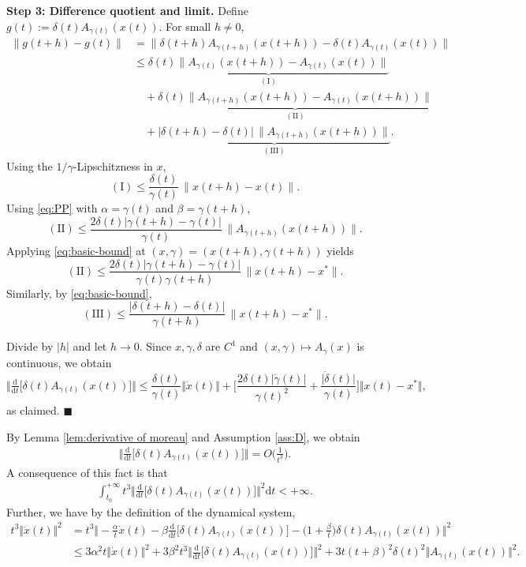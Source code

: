 \documentclass[11pt]{article}
\numberwithin{equation}{section}
\newenvironment{proof}{\bigskip\noindent{\bf Proof.}}{\hfill $\blacksquare$ \par\bigskip\noindent}
\begin{document}
\begin{proof}
\textbf{Step 3: Difference quotient and limit.}
Define $g(t):=\delta(t)A_{\gamma(t)}(x(t))$. For small $h\neq0$,
\[
\begin{aligned}
\|g(t+h)-g(t)\|
&= \|\delta(t+h)A_{\gamma(t+h)}(x(t+h))-\delta(t)A_{\gamma(t)}(x(t))\|\\
&\le \underbrace{\delta(t)\|A_{\gamma(t)}(x(t+h))-A_{\gamma(t)}(x(t))\|}_{\mathrm{(I)}}\\
&\quad + \underbrace{\delta(t)\|A_{\gamma(t+h)}(x(t+h))-A_{\gamma(t)}(x(t+h))\|}_{\mathrm{(II)}}\\
&\quad + \underbrace{|\delta(t+h)-\delta(t)|\,\|A_{\gamma(t+h)}(x(t+h))\|}_{\mathrm{(III)}}.
\end{aligned}
\]
Using the $1/\gamma$-Lipschitzness in $x$,
\[
\mathrm{(I)} \le \frac{\delta(t)}{\gamma(t)}\,\|x(t+h)-x(t)\|.
\]
Using \eqref{eq:PP} with $\alpha=\gamma(t)$ and $\beta=\gamma(t+h)$,
\[
\mathrm{(II)} \le \frac{2\delta(t)|\gamma(t+h)-\gamma(t)|}{\gamma(t)}\,\|A_{\gamma(t+h)}(x(t+h))\|.
\]
Applying \eqref{eq:basic-bound} at $(x,\gamma)=(x(t+h),\gamma(t+h))$ yields
\[
\mathrm{(II)} \le \frac{2\delta(t)|\gamma(t+h)-\gamma(t)|}{\gamma(t)\gamma(t+h)}\,\|x(t+h)-x^*\|.
\]
Similarly, by \eqref{eq:basic-bound},
\[
\mathrm{(III)} \le \frac{|\delta(t+h)-\delta(t)|}{\gamma(t+h)}\,\|x(t+h)-x^*\|.
\]

Divide by $|h|$ and let $h\to0$. Since $x,\gamma,\delta$ are $C^1$ and $(x,\gamma)\mapsto A_\gamma(x)$ is continuous, we obtain
\[
\Big\Vert \tfrac{\mathrm{d}}{\mathrm{d}t}\big[\delta(t)A_{\gamma(t)}(x(t))\big] \Big\Vert
\le \frac{\delta(t)}{\gamma(t)}\Vert \dot{x}(t) \Vert
+ \Big[\frac{2\delta(t)\vert \dot{\gamma}(t)\vert}{\gamma(t)^2}
+ \frac{\vert \dot{\delta}(t)\vert}{\gamma(t)}\Big]\Vert x(t)-x^* \Vert,
\]
as claimed.
\end{proof}
By Lemma \ref{lem:derivative of moreau} and Assumption \ref{ass:D}, we obtain
\begin{align*}
\Big \Vert \frac{\mathrm{d}}{\mathrm{d}t}\Big[\delta(t)A_{\gamma(t)}(x(t))\Big] \Big \Vert ={O}\Big(\frac{1}{t^3}\Big). 
\end{align*}
A consequence of this fact is that 
\begin{align}
\label{velocity convergence:ingre2}
\int_{t_0}^{+\infty} t^3\Big \Vert \frac{\mathrm{d}}{\mathrm{d}t}\Big[\delta(t)A_{\gamma(t)}(x(t))\Big] \Big \Vert^2\mathrm{d}t <+\infty.
\end{align}
Further, we have by the definition of the dynamical system, 
\begin{align*}
    t^3\Vert \ddot{x}(t)\Vert^2 &=t^3 \Big\Vert -\frac{\alpha}{t}\dot{x}(t)-\beta\frac{\mathrm{d}}{\mathrm{d}t}\Big[\delta(t)A_{\gamma(t)}(x(t))\Big]-\Big(1+\frac{\beta}{t}\Big)\delta(t)A_{\gamma(t)}(x(t))\Big\Vert^2 \\
    &\le 3\alpha^2t\Vert \dot{x}(t) \Vert^2+3\beta^2t^3\Big \Vert \frac{\mathrm{d}}{\mathrm{d}t}\Big[\delta(t)A_{\gamma(t)}(x(t))\Big] \Big \Vert^2+3t(t+\beta)^2\delta(t)^2\Big \Vert A_{\gamma(t)}(x(t)) \Big \Vert^2.
\end{align*}
\end{document}

